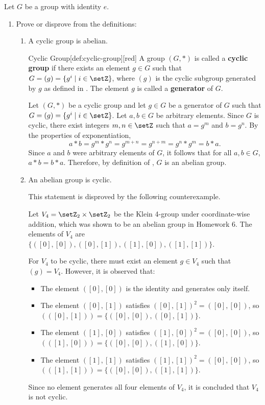 \newpage
Let $G$ be a group with identity $e$.
\begin{enumerate}
  \item Prove or disprove from the definitions:
  \begin{enumerate}
    \item A cyclic group is abelian.
    \begin{define}{Cyclic Group}[def:cyclic-group][red]
      A group $(G, *)$ is called a \textbf{cyclic group} if there exists an element $g \in G$ such that $G = (g) = \{g^i \mid i \in \setZ\}$, 
      where $(g)$ is the cyclic subgroup generated by $g$ as defined in . 
      The element $g$ is called a \textbf{generator} of $G$.
    \end{define}
    \begin{subprove}
      Let $(G, *)$ be a cyclic group and let $g \in G$ be a generator of $G$ such that $G = (g) = \{g^i \mid i \in \setZ\}$.
      Let $a, b \in G$ be arbitrary elements.
      Since $G$ is cyclic, there exist integers $m, n \in \setZ$ such that $a = g^m$ and $b = g^n$.
      By the properties of exponentiation,
      \[
        a * b = g^m * g^n = g^{m+n} = g^{n+m} = g^n * g^m = b * a.
      \]
      Since $a$ and $b$ were arbitrary elements of $G$, it follows that for all $a, b \in G$, $a * b = b * a$.
      Therefore, by definition of , $G$ is an abelian group.
    \end{subprove}
    \item An abelian group is cyclic.
    \begin{subprove}
      This statement is disproved by the following counterexample.
      
      Let $V_4 = \setZ_2 \times \setZ_2$ be the Klein 4-group under coordinate-wise addition, 
      which was shown to be an abelian group in Homework 6.
      The elements of $V_4$ are $\{([0],[0]), ([0],[1]), ([1],[0]), ([1],[1])\}$.
      
      For $V_4$ to be cyclic, there must exist an element $g \in V_4$ such that $(g) = V_4$.
      However, it is observed that:
      \begin{itemize}
        \item The element $([0],[0])$ is the identity and generates only itself.
        \item The element $([0],[1])$ satisfies $([0],[1])^2 = ([0],[0])$, so $( ([0],[1]) ) = \{([0],[0]), ([0],[1])\}$.
        \item The element $([1],[0])$ satisfies $([1],[0])^2 = ([0],[0])$, so $( ([1],[0]) ) = \{([0],[0]), ([1],[0])\}$.
        \item The element $([1],[1])$ satisfies $([1],[1])^2 = ([0],[0])$, so $( ([1],[1]) ) = \{([0],[0]), ([1],[1])\}$.
      \end{itemize}
      Since no element generates all four elements of $V_4$, it is concluded that $V_4$ is not cyclic.
      

\end{subprove}
\end{enumerate}
\end{enumerate}
